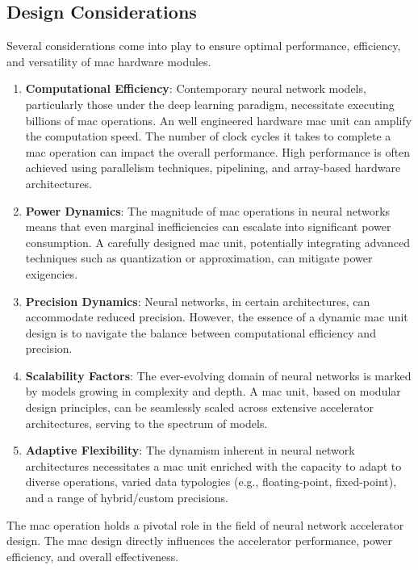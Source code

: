 \subsection{Design Considerations}
Several considerations come into play to ensure optimal performance, efficiency, and versatility of \gls{mac} hardware modules.

\begin{enumerate}
	\item \textbf{Computational Efficiency}: Contemporary neural network models, particularly those under the deep learning paradigm, necessitate executing billions of \gls{mac} operations. An well engineered hardware \gls{mac} unit can amplify the computation speed. The number of clock cycles it takes to complete a \gls{mac} operation can impact the overall performance. High performance is often achieved using parallelism techniques, pipelining, and array-based hardware architectures.
	
	\item \textbf{Power Dynamics}: The magnitude of \gls{mac} operations in neural networks means that even marginal inefficiencies can escalate into significant power consumption. A carefully designed \gls{mac} unit, potentially integrating advanced techniques such as quantization or approximation, can mitigate power exigencies.
	
	\item \textbf{Precision Dynamics}: Neural networks, in certain architectures, can accommodate reduced precision. However, the essence of a dynamic \gls{mac} unit design is to navigate the balance between computational efficiency and precision.
	
	\item \textbf{Scalability Factors}: The ever-evolving domain of neural networks is marked by models growing in complexity and depth. A \gls{mac} unit, based on modular design principles, can be seamlessly scaled across extensive accelerator architectures, serving to the spectrum of models.
	
	\item \textbf{Adaptive Flexibility}: The dynamism inherent in neural network architectures necessitates a \gls{mac} unit enriched with the capacity to adapt to diverse operations, varied data typologies (e.g., floating-point, fixed-point), and a range of hybrid/custom precisions.
\end{enumerate}

The \gls{mac} operation holds a pivotal role in the field of neural network accelerator design. The \gls{mac} design directly influences the accelerator performance, power efficiency, and overall effectiveness.



